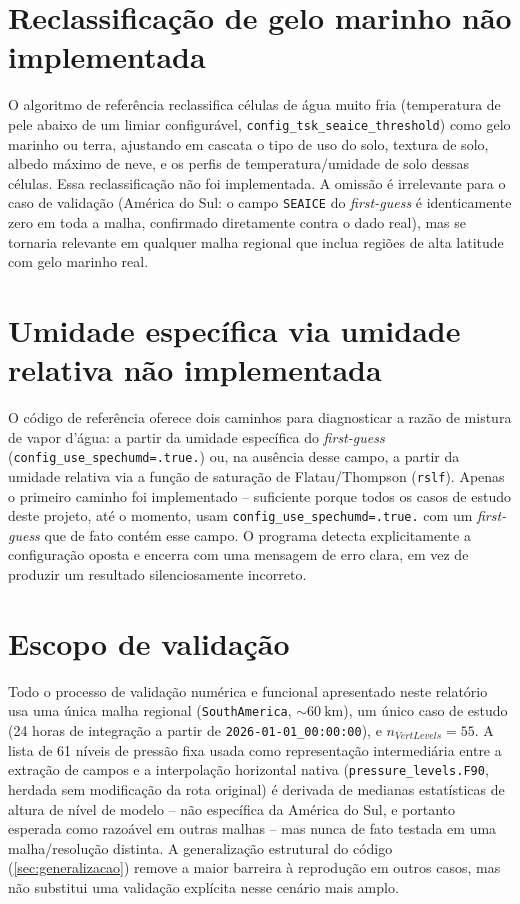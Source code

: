 \section{Reclassificação de gelo marinho não implementada}

O algoritmo de referência reclassifica células de água muito fria
(temperatura de pele abaixo de um limiar configurável,
\texttt{config\_tsk\_seaice\_threshold}) como gelo marinho ou terra,
ajustando em cascata o tipo de uso do solo, textura de solo, albedo
máximo de neve, e os perfis de temperatura/umidade de solo dessas
células. Essa reclassificação não foi implementada. A omissão é
irrelevante para o caso de validação (América do Sul: o campo
\texttt{SEAICE} do \textit{first-guess} é identicamente zero em toda a
malha, confirmado diretamente contra o dado real), mas se tornaria
relevante em qualquer malha regional que inclua regiões de alta
latitude com gelo marinho real.

\section{Umidade específica via umidade relativa não implementada}

O código de referência oferece dois caminhos para diagnosticar a razão
de mistura de vapor d'água: a partir da umidade específica do
\textit{first-guess} (\texttt{config\_use\_spechumd=.true.}) ou, na
ausência desse campo, a partir da umidade relativa via a função de
saturação de Flatau/Thompson (\texttt{rslf}). Apenas o primeiro caminho
foi implementado -- suficiente porque todos os casos de estudo deste
projeto, até o momento, usam \texttt{config\_use\_spechumd=.true.} com um
\textit{first-guess} que de fato contém esse campo. O programa detecta
explicitamente a configuração oposta e encerra com uma mensagem de erro
clara, em vez de produzir um resultado silenciosamente incorreto.

\section{Escopo de validação}

Todo o processo de validação numérica e funcional apresentado neste
relatório usa uma única malha regional (\texttt{SouthAmerica},
$\sim\SI{60}{\kilo\metre}$), um único caso de estudo (24 horas de
integração a partir de \texttt{2026-01-01\_00:00:00}), e
$n_{VertLevels}=55$. A lista de 61 níveis de pressão fixa usada como
representação intermediária entre a extração de campos e a interpolação
horizontal nativa (\texttt{pressure\_levels.F90}, herdada sem
modificação da rota original) é derivada de medianas estatísticas de
altura de nível de modelo -- não específica da América do Sul, e portanto
esperada como razoável em outras malhas -- mas nunca de fato testada em
uma malha/resolução distinta. A generalização estrutural do código
(\cref{sec:generalizacao}) remove a maior barreira à reprodução em outros
casos, mas não substitui uma validação explícita nesse cenário mais
amplo.

